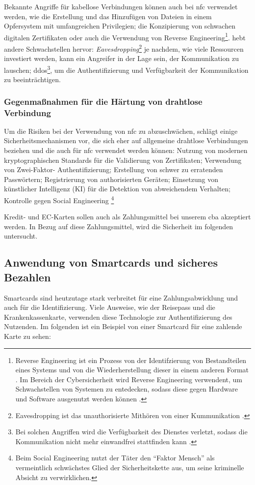 Bekannte Angriffe für kabellose Verbindungen können auch bei nfc verwendet werden\cite{refip:NYRS}, wie die
Erstellung und das Hinzufügen von Dateien in einem Opfersystem mit umfangreichen Privilegien; die Konzipierung
von schwachen digitalen Zertifikaten oder auch die Verwendung von Reverse Engineering\footnote{Reverse
Engineering ist ein Prozess von der Identifzierung von Bestandteilen eines Systems und von die Wiederherstellung 
dieser in einem anderen Format \cite{refart:CHRE}. Im Bereich der Cybersicherheit wird Reverse Engineering 
verwendent, um Schwachstellen von Systemen zu entedecken, sodass diese gegen Hardware und Software ausgenutzt
werden können \cite{refip:CMBM}.}. \cite{refart:ALSI} hebt andere Schwachstellen hervor: 
\textit{Eavesdropping}\footnote{Eavesdropping ist das unauthorisierte Mithören von einer Kummunikation 
\cite{refbook:SWIS}.} je nachdem, wie viele Ressourcen investiert werden, kann ein Angreifer in der 
Lage sein, der Kommunikation zu lauschen; ddos\footnote{Bei solchen Angriffen wird die
Verfügbarkeit des Dienstes verletzt, sodass die Kommunikation nicht mehr einwandfrei stattfinden kann 
\cite{refbook:SWIS}.}, um die Authentifizierung und Verfügbarkeit der Kommunikation zu beeinträchtigen.


\subsubsection{Gegenmaßnahmen für die Härtung von drahtlose Verbindung}

Um die Risiken bei der Verwendung von nfc zu abzuschwächen, schlägt \cite{refip:NYRS} einige Sicherheitsmechanismen vor, 
die sich eher auf allgemeine drahtlose Verbindungen beziehen und die auch für nfc verwendet werden können: Nutzung von modernen 
kryptographischen Standards für die Validierung von Zertifikaten; Verwendung von Zwei-Faktor- Authentifizierung; Erstellung
von schwer zu erratenden Passwörtern; Registrierung von authorisierten Geräten; Einsetzung von künstlicher Intelligenz 
(KI) für die Detektion von abweichendem Verhalten; Kontrolle gegen Social Engineering \footnote{Beim Social Engineering
nutzt der Täter den ``Faktor Mensch'' als vermeintlich schwächstes Glied der Sicherheitskette aus, um seine kriminelle
Absicht zu verwirklichen.\cite{booklet:BSSE}}

Kredit- und EC-Karten sollen auch als Zahlungsmittel bei unserem cba akzeptiert werden. 
In Bezug auf diese Zahlungsmittel, wird die Sicherheit im folgenden untersucht.

\subsection{Anwendung von Smartcards und sicheres Bezahlen}
Smartcards sind heutzutage stark verbreitet für eine Zahlungsabwicklung und auch für die Identifizierung.
Viele Ausweise, wie der Reisepass und die Krankenkassenkarte, verwenden diese Technologie zur Authentifizierung
des Nutzenden. Im folgenden ist ein Beispiel von einer Smartcard für eine zahlende Karte zu sehen: 

